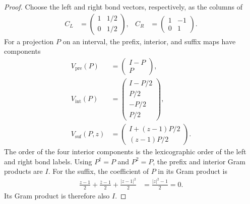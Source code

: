 \documentclass[11pt]{article}
\begin{document}
\begin{proof}
Choose the left and right bond vectors, respectively, as the columns of
\begin{align}
 C_L&=\begin{pmatrix}1&1/2\\0&1/2\end{pmatrix},&
 C_R&=\begin{pmatrix}1&-1\\0&1\end{pmatrix}.
\end{align}
For a projection $P$ on an interval, the prefix, interior, and suffix maps
have components
\begin{align}
 V_{\mathrm{pre}}(P)&=\begin{pmatrix}I-P\\P\end{pmatrix},\\
 V_{\mathrm{int}}(P)&=\begin{pmatrix}I-P/2\\P/2\\-P/2\\P/2\end{pmatrix},\\
 V_{\mathrm{suf}}(P,z)&=\begin{pmatrix}I+(z-1)P/2\\(z-1)P/2\end{pmatrix}.
 \label{eq:projection-isometries}
\end{align}
The order of the four interior components is the lexicographic order of
the left and right bond labels. Using $P^\dagger=P$ and $P^2=P$, the prefix
and interior Gram products are $I$. For the suffix, the coefficient of $P$
in its Gram product is
\begin{align}
 \frac{z-1}{2}+\frac{\bar z-1}{2}
 +\frac{|z-1|^2}{2}&=\frac{|z|^2-1}{2}=0.
\end{align}
Its Gram product is therefore also $I$.


\end{proof}
\end{document}
